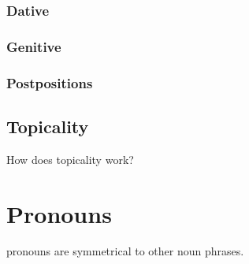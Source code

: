 \subsubsection{Dative}
\label{subsubsec:tvk-nouns-dative}

\subsubsection{Genitive}
\label{subsubsec:tvk-nouns-genitive}

\subsubsection{Postpositions}
\label{subsubsec:tvk-nouns-postpositions}

\subsection{Topicality}
\label{subsec:tvk-nouns-topicality}

How does topicality work?

\section{Pronouns}
\label{sec:tvk-pronouns}

\langtvk{} pronouns are symmetrical to other noun phrases\autocite{wals-50}.
